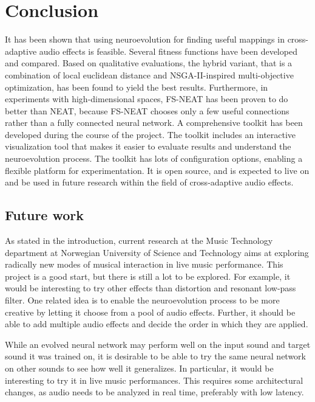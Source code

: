 \chapter{Conclusion}
It has been shown that using neuroevolution for finding useful mappings in cross-adaptive audio effects is feasible. Several fitness functions have been developed and compared. Based on qualitative evaluations, the hybrid variant, that is a combination of local euclidean distance and NSGA-II-inspired multi-objective optimization, has been found to yield the best results. Furthermore, in experiments with high-dimensional spaces, FS-NEAT has been proven to do better than NEAT, because FS-NEAT chooses only a few useful connections rather than a fully connected neural network. A comprehensive toolkit has been developed during the course of the project. The toolkit includes an interactive visualization tool that makes it easier to evaluate results and understand the neuroevolution process. The toolkit has lots of configuration options, enabling a flexible platform for experimentation. It is open source, and is expected to live on and be used in future research within the field of cross-adaptive audio effects.

\section{Future work}

As stated in the introduction, current research at the Music Technology department at Norwegian University of Science and Technology aims at exploring radically new modes of musical interaction in live music performance. This project is a good start, but there is still a lot to be explored. For example, it would be interesting to try other effects than distortion and resonant low-pass filter. One related idea is to enable the neuroevolution process to be more creative by letting it choose from a pool of audio effects. Further, it should be able to add multiple audio effects and decide the order in which they are applied.

While an evolved neural network may perform well on the input sound and target sound it was trained on, it is desirable to be able to try the same neural network on other sounds to see how well it generalizes. In particular, it would be interesting to try it in live music performances. This requires some architectural changes, as audio needs to be analyzed in real time, preferably with low latency.

